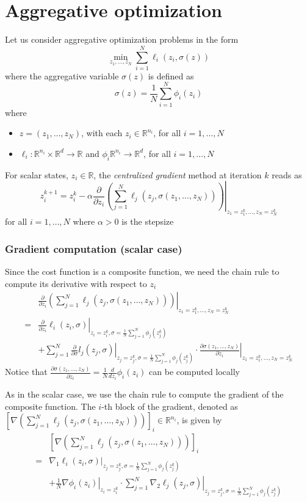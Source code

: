 \documentclass{book}
\newcommand{\R}{\mathbb{R}}
\theoremstyle{theoremv2}
\theoremstyle{defv2}
\theoremstyle{remark}
\theoremstyle{remark}
\theoremstyle{definition}
\theoremstyle{definition}
\begin{document}
\section{Aggregative optimization}
Let us consider aggregative optimization problems in the form 
\[
    \min_{z_1,\dots,z_N} \displaystyle\sum_{i=1}^{N} \ell_i(z_i,\sigma(z))
\]
where the aggregative variable $\sigma(z)$ is defined as 
\[
    \sigma(z) = \displaystyle\frac{1}{N}\displaystyle\sum_{i=1}^{N} \phi_i(z_i)
\]
where 
\begin{itemize}
    \item $z=(z_1,\dots,z_N)$, with each $z_i\in\R^{n_i}$, for all $i=1,\dots,N$
    \item $\ell_i:\R^{n_i}\times\R^d\to\R$ and $\phi_i\R^{n_i}\to\R^d$, for all $i=1,\dots,N$
\end{itemize}
For scalar states, $z_i\in\R$, the \emph{centralized gradient} method at iteration $k$ reads as 
\[
    z_i^{k+1} = z_i^k -\alpha \displaystyle\frac{\partial}{\partial z_i}\left. \left(\displaystyle\sum_{j=1}^{N}\ell_j(z_j,\sigma(z_1,\dots,z_N))\right)\right|_{z_1 = z_1^k,\dots,z_N = z_N^k}
\]
for all $i=1,\dots,N$ where $\alpha>0$ is the stepsize
\subsubsection{Gradient computation (scalar case)}
Since the cost function is a composite function, we need the chain rule to compute its derivative with respect to $z_i$ 
\begin{align*}
    &\displaystyle\frac{\partial}{\partial z_i}\left.\left(\displaystyle\sum_{j=1}^{N}\ell_j(z_j,\sigma(z_1,\dots,z_N))\right)\right|_{z_1 = z_1^k,\dots,z_N = z_N^k} \\
    =& \left.\displaystyle\frac{\partial}{\partial z_i} \ell_i(z_i,\sigma)\right|_{z_i=z_i^k, \sigma=\frac{1}{N}\sum_{j=1}^{N}\phi_j(z_j^k)}  \\
    &+\left. \sum_{j=1}^{N}\displaystyle\frac{\partial}{\partial\sigma}l_j(z_j,\sigma)\right|_{z_j=z_j^k, \sigma=\frac{1}{N}\sum_{j=1}^{N}\phi_j(z_j^k)}\cdot \left.\displaystyle\frac{\partial\sigma(z_1,\dots,z_N)}{\partial z_i}\right|_{z_1=z_1^k,\dots,z_N = z_N^k}
\end{align*}
Notice that $\displaystyle\frac{\partial\sigma(z_1,\dots,z_N)}{\partial z_i}=\displaystyle\frac{1}{N}\displaystyle\frac{d}{d z_i}\phi_i(z_i)$ can be computed locally

As in the scalar case, we use the chain rule to compute the gradient of the composite function. The $i$-th block of the gradient, denoted as $\left[\nabla\left(\displaystyle\sum_{j=1}^{N}\ell_j(z_j,\sigma(z_1,\dots,z_N))\right)\right]_i\in\R^{n_i}$, is given by
\begin{align*}
    &\left[\nabla\left(\displaystyle\sum_{j=1}^{N}\ell_j(z_j,\sigma(z_1,\dots,z_N))\right)\right]_i \\ 
    =& \left.\nabla_1\ell_i(z_i,\sigma)\right|_{z_j=z_j^k, \sigma=\frac{1}{N}\sum_{j=1}^{N}\phi_j(z_j^k)} \\ 
    &+ \left.\displaystyle\frac{1}{N}\nabla \phi_i(z_i)\right|_{z_i=z_i^k}\cdot \left.\displaystyle\sum_{j=1}^{N}\nabla_2 \ell_j(z_j,\sigma)\right|_{z_j=z_j^k, \sigma=\frac{1}{N}\sum_{j=1}^{N}\phi_j(z_j^k)}
\end{align*}
\end{document}
